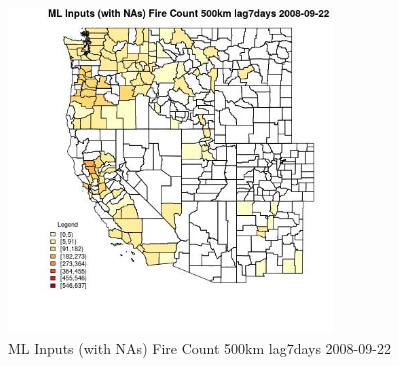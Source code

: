 \begin{figure} 
\centering  
\includegraphics[width=0.77\textwidth]{Code_Outputs/Report_ML_input_PM25_Step4_part_e_de_duplicated_aves_compiled_2019-05-18wNAs_CountyFire_Count_500km_lag7daysMean2008-09-22.jpg} 
\caption{\label{fig:Report_ML_input_PM25_Step4_part_e_de_duplicated_aves_compiled_2019-05-18wNAsCountyFire_Count_500km_lag7daysMean2008-09-22}ML Inputs (with NAs) Fire Count 500km lag7days 2008-09-22} 
\end{figure} 
 
